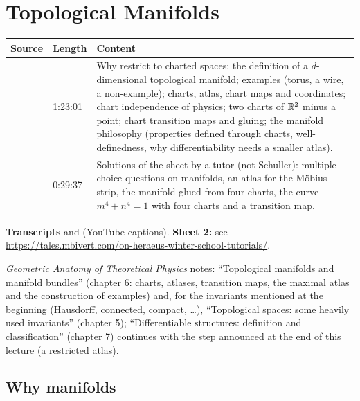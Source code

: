\chapter{Topological Manifolds}\label{ch:c02}
\begin{paracol}{2}

\begin{sources}
\begin{tabularx}{\linewidth}{@{}l l L@{}}
\toprule
\textbf{Source} & \textbf{Length} & \textbf{Content}\\
\midrule
{} & 1:23:01 & Why restrict to charted spaces; the definition of a $d$-dimensional topological manifold;
examples (torus, a wire, a non-example); charts, atlas, chart maps and coordinates; chart independence of physics; two charts of $\mathbb{R}^2$ minus a point; chart transition
maps and gluing; the manifold philosophy (properties defined through charts, well-definedness, why differentiability needs a smaller atlas).\\
 & 0:29:37 & Solutions of the sheet by a tutor (not Schuller): multiple-choice questions on manifolds, an atlas for the
M\"obius strip, the manifold glued from four charts, the curve $m^4+n^4=1$ with four charts and a transition map.\\
\bottomrule
\end{tabularx}

\smallskip
\textbf{Transcripts}  and  (YouTube captions).
\textbf{Sheet 2:} see \url{https://tales.mbivert.com/on-heraeus-winter-school-tutorials/}.
\end{sources}

\begin{reading}
\emph{Geometric Anatomy of Theoretical Physics} notes: ``Topological manifolds and manifold bundles'' (chapter 6: charts, atlases, transition maps, the
maximal atlas and the construction of examples) and, for the invariants mentioned at the beginning (Hausdorff, connected, compact, \dots),
``Topological spaces: some heavily used invariants'' (chapter 5); ``Differentiable structures: definition and classification'' (chapter 7) continues
with the step announced at the end of this lecture (a restricted atlas).
\end{reading}

\section{Why manifolds}\label{sec:c02-why}


\end{paracol}
